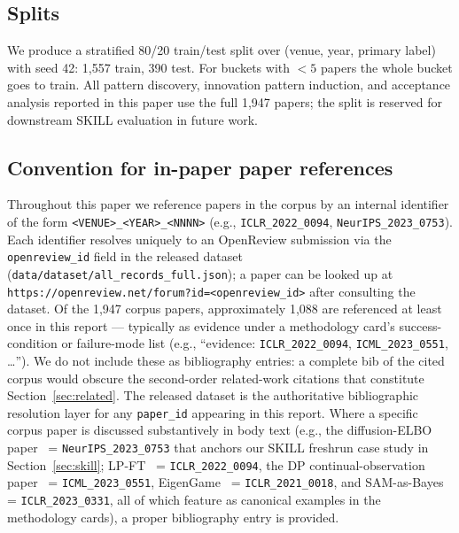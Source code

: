 \documentclass[10pt,a4paper]{article}
\begin{document}
\subsection{Splits}

We produce a stratified 80/20 train/test split over (venue, year, primary label) with seed 42: 1{,}557 train, 390 test. For buckets with $<5$ papers the whole bucket goes to train. All pattern discovery, innovation pattern induction, and acceptance analysis reported in this paper use the full 1{,}947 papers; the split is reserved for downstream SKILL evaluation in future work.

\subsection{Convention for in-paper paper references}
\label{subsec:paper-id-convention}

Throughout this paper we reference papers in the corpus by an internal identifier of the form \texttt{<VENUE>\_<YEAR>\_<NNNN>} (e.g., \texttt{ICLR\_2022\_0094}, \texttt{NeurIPS\_2023\_0753}). Each identifier resolves uniquely to an OpenReview submission via the \texttt{openreview\_id} field in the released dataset (\texttt{data/dataset/all\_records\_full.json}); a paper can be looked up at \texttt{https://openreview.net/forum?id=<openreview\_id>} after consulting the dataset. Of the 1{,}947 corpus papers, approximately 1{,}088 are referenced at least once in this report --- typically as evidence under a methodology card's success-condition or failure-mode list (e.g., ``evidence: \texttt{ICLR\_2022\_0094}, \texttt{ICML\_2023\_0551}, \ldots''). We do not include these as bibliography entries: a complete bib of the cited corpus would obscure the second-order related-work citations that constitute Section~\ref{sec:related}. The released dataset is the authoritative bibliographic resolution layer for any \texttt{paper\_id} appearing in this report. Where a specific corpus paper is discussed substantively in body text (e.g., the diffusion-ELBO paper~\cite{kingma2023diffusion} = \texttt{NeurIPS\_2023\_0753} that anchors our SKILL freshrun case study in Section~\ref{sec:skill}; LP-FT~\cite{kumar2022lpft} = \texttt{ICLR\_2022\_0094}, the DP continual-observation paper~\cite{henzinger2023dpcontinual} = \texttt{ICML\_2023\_0551}, EigenGame~\cite{gemp2021eigengame} = \texttt{ICLR\_2021\_0018}, and SAM-as-Bayes~\cite{mollenhoff2023sambayes} = \texttt{ICLR\_2023\_0331}, all of which feature as canonical examples in the methodology cards), a proper bibliography entry is provided.
\end{document}
